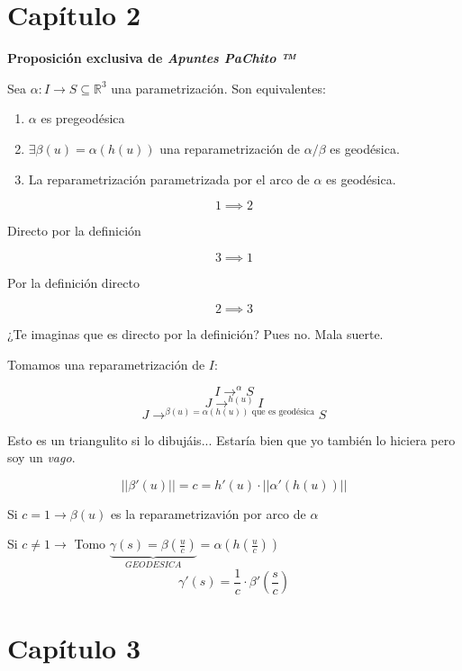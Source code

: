 \documentclass[openany]{book}
\begin{document}
\chapter{Capítulo 2}

\begin{proposition}
  { \color{turquoise} \textbf{Proposición exclusiva de \textit{Apuntes PaChito ™}}}

  Sea $\alpha : I \to S \subseteq \mathbb{R}^{ 3 } $ una parametrización. Son equivalentes:

  \begin{enumerate}
    \item $\alpha$ es pregeodésica
    \item $\exists \beta (u) = \alpha (h(u))$ una reparametrización de $\alpha /\beta $ es geodésica.
    \item La reparametrización parametrizada por el arco de $\alpha $ es geodésica.
  \end{enumerate}
\end{proposition}
\begin{demonstration}
  $$ 1 \implies 2 $$

  Directo por la definición

  $$ 3 \implies 1 $$

  Por la definición directo

  $$ 2 \implies 3 $$

  ¿Te imaginas que es directo por la definición? Pues no. Mala suerte.

  Tomamos una reparametrización de $I$:

  $$ I \to^\alpha S $$
  $$ J \to^{h(u)} I $$
  $$ J \to^{\beta (u) = \alpha (h(u)) \text{ que es geodésica}} S $$

  Esto es un triangulito si lo dibujáis... Estaría bien que yo también lo hiciera pero soy un \textit{vago}.

  $$ ||\beta '(u)||= c = h'(u) \cdot ||\alpha '(h(u))|| $$

  Si $c=1 \to \beta (u)$ es la reparametrizavión por arco de $\alpha $

  Si $c \ne 1 \to $ Tomo $\underbrace{ \gamma (s) = \beta(\frac{u}{c}) }_{ GEODESICA } = \alpha (h(\frac{u}{c}))$
  $$ \gamma '(s) = \dfrac{1}{c} \cdot  \beta'\left(\frac{s}{c}\right) $$
\end{demonstration}











\chapter{Capítulo 3}
\end{document}
